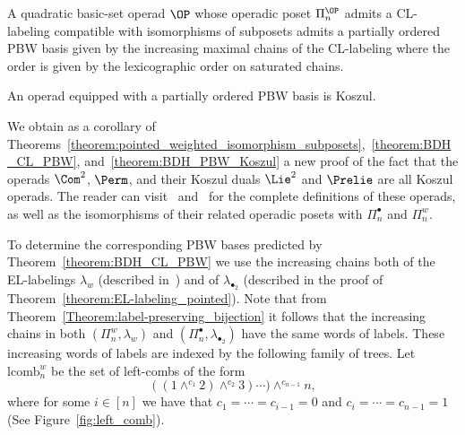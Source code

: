  \begin{theo}\label{theorem:BDH_CL_PBW} A quadratic basic-set operad $\OP$ whose operadic poset $\Pi^{\OP}_n$ admits a CL-labeling compatible with isomorphisms of subposets admits a partially ordered PBW basis given by the increasing maximal chains of the CL-labeling where the order is given by the lexicographic order on saturated chains.
 \end{theo}

  \begin{theo}\label{theorem:BDH_PBW_Koszul} An operad equipped with a partially ordered PBW basis is Koszul.
 \end{theo}

 We obtain as a corollary of Theorems~\ref{theorem:pointed_weighted_isomorphism_subposets},~\ref{theorem:BDH_CL_PBW}, and~\ref{theorem:BDH_PBW_Koszul} a new proof of the fact that the operads $\Com^2$, $\Perm$, and their Koszul duals $\Lie^2$ and $\Prelie$ are all Koszul operads. 
The reader can visit~\cite{ChapotonVallete2006} and~\cite{DotsenkoKhoroshkin2007} for the complete definitions of these operads, as well as the isomorphisms of their related operadic posets with $\Pi_n^{\bullet}$ and $\Pi_n^w$.

 

To determine the corresponding PBW bases predicted by Theorem~\ref{theorem:BDH_CL_PBW} we use the increasing chains both of the EL-labelings $\lambda_{w}$  (described in~\cite[Theorem 3.2]{GonzalezDleonWachs2016}) and of  $\lambda_{\bullet_2}$  (described in the proof of Theorem~\ref{theorem:EL-labeling_pointed}). Note that from Theorem~\ref{Theorem:label-preserving_bijection} it follows that the increasing chains in both $(\Pi_n^w,\lambda_w)$ and $(\Pi_n^{\bullet},\lambda_{\bullet_2})$ have the same words of labels. These increasing words of labels are indexed by the following family of trees. Let $\mathrm{lcomb}_{n}^{w}$ be the set of left-combs of the form
 $$((1\wedge^{c_1} 2)\wedge^{c_2} 3)\cdots ) \wedge^{c_{n-1}} n,$$
 where for some $i\in [n]$ we have that $c_1=\cdots =c_{i-1}=0$  and $c_i=\cdots =c_{n-1}=1$ (See Figure~\ref{fig:left_comb}).


